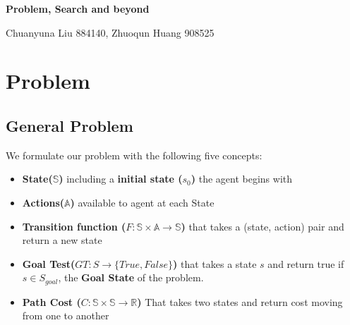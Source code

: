 \documentclass[10.5pt,a4paper]{article}
\begin{document}
    \begin{center}
        \large \textbf{Problem, Search and beyond}
        
        \normalsize Chuanyuna Liu 884140, Zhuoqun Huang 908525
    \end{center}
    \section{Problem}
    \subsection{General Problem}
    We formulate our problem with the following five concepts:
    \begin{itemize}
        \itemsep0em
        \item \textbf{State($\mathbb{S}$)} including a \textbf{initial state ($s_0$)} the agent begins with
        \item \textbf{Actions($\mathbb{A}$)} available to agent at each State
        \item \textbf{Transition function ($F:\mathbb{S}\times \mathbb{A}\rightarrow \mathbb{S}$)} that takes a (state, action) pair and return a new state
        \item \textbf{Goal Test($GT:S\rightarrow \{True, False\}$)} that takes a state $s$ and return true if $s\in S_{goal}$, the \textbf{Goal State} of the problem.
        \item \textbf{Path Cost ($C:\mathbb{S}\times \mathbb{S}\rightarrow \mathbb{R}$)} That takes two states and return cost moving from one to another
    \end{itemize}
    \vspace{-15pt}
\end{document}
